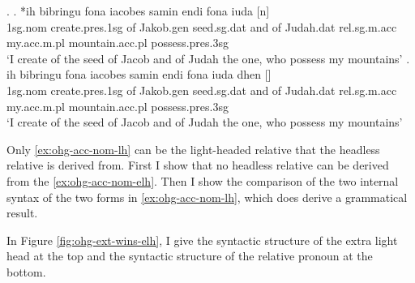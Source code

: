 \ex.\label{ex:ohg-acc-nom-rep}
\ag. *ih bibringu fona iacobes samin endi fona iuda [n]    \\
1\ac{sg}.\ac{nom} {create}.\ac{pres}.1\ac{sg}\scsub{[acc]} of Jakob.\ac{gen} seed.\ac{sg}.\ac{dat} and of Judah.\ac{dat} \ac{rel}.\ac{sg}.\ac{m}.\ac{acc} my.\ac{acc}.\ac{m}.\ac{pl} mountain.\ac{acc}.\ac{pl} possess.\ac{pres}.3\ac{sg}\scsub{[nom]}\\
`I create of the seed of Jacob and of Judah the one, who possess my mountains' \label{ex:ohg-acc-nom-elh}
\bg. ih bibringu fona iacobes samin endi fona iuda dhen []   \\
1\ac{sg}.\ac{nom} {create}.\ac{pres}.1\ac{sg}\scsub{[acc]} of Jakob.\ac{gen} seed.\ac{sg}.\ac{dat} and of Judah.\ac{dat} \ac{rel}.\ac{sg}.\ac{m}.\ac{acc} my.\ac{acc}.\ac{m}.\ac{pl} mountain.\ac{acc}.\ac{pl} possess.\ac{pres}.3\ac{sg}\scsub{[nom]}\\
`I create of the seed of Jacob and of Judah the one, who possess my mountains' \label{ex:ohg-acc-nom-lh}

Only \ref{ex:ohg-acc-nom-lh} can be the light-headed relative that the headless relative is derived from. First I show that no headless relative can be derived from the \ref{ex:ohg-acc-nom-elh}. Then I show the comparison of the two internal syntax of the two forms in \ref{ex:ohg-acc-nom-lh}, which does derive a grammatical result.

In Figure \ref{fig:ohg-ext-wins-elh}, I give the syntactic structure of the extra light head at the top and the syntactic structure of the relative pronoun at the bottom.

